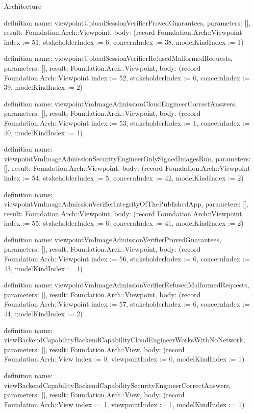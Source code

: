 \begin{lexlean}{Architecture}
\begin{semanticmodule}
definition{
  name: viewpointUploadSessionVerifierProvedGuarantees,
  parameters: [],
  result: Foundation.Arch::Viewpoint,
  body: (record Foundation.Arch::Viewpoint {index := 51, stakeholderIndex := 6, concernIndex := 38, modelKindIndex := 1})
}

definition{
  name: viewpointUploadSessionVerifierRefusedMalformedRequests,
  parameters: [],
  result: Foundation.Arch::Viewpoint,
  body: (record Foundation.Arch::Viewpoint {index := 52, stakeholderIndex := 6, concernIndex := 39, modelKindIndex := 2})
}

definition{
  name: viewpointVmImageAdmissionCloudEngineerCorrectAnswers,
  parameters: [],
  result: Foundation.Arch::Viewpoint,
  body: (record Foundation.Arch::Viewpoint {index := 53, stakeholderIndex := 1, concernIndex := 40, modelKindIndex := 1})
}

definition{
  name: viewpointVmImageAdmissionSecurityEngineerOnlySignedImagesRun,
  parameters: [],
  result: Foundation.Arch::Viewpoint,
  body: (record Foundation.Arch::Viewpoint {index := 54, stakeholderIndex := 5, concernIndex := 42, modelKindIndex := 2})
}

definition{
  name: viewpointVmImageAdmissionVerifierIntegrityOfThePublishedApp,
  parameters: [],
  result: Foundation.Arch::Viewpoint,
  body: (record Foundation.Arch::Viewpoint {index := 55, stakeholderIndex := 6, concernIndex := 41, modelKindIndex := 2})
}

definition{
  name: viewpointVmImageAdmissionVerifierProvedGuarantees,
  parameters: [],
  result: Foundation.Arch::Viewpoint,
  body: (record Foundation.Arch::Viewpoint {index := 56, stakeholderIndex := 6, concernIndex := 43, modelKindIndex := 1})
}

definition{
  name: viewpointVmImageAdmissionVerifierRefusedMalformedRequests,
  parameters: [],
  result: Foundation.Arch::Viewpoint,
  body: (record Foundation.Arch::Viewpoint {index := 57, stakeholderIndex := 6, concernIndex := 44, modelKindIndex := 2})
}

definition{
  name: viewBackendCapabilityBackendCapabilityCloudEngineerWorksWithNoNetwork,
  parameters: [],
  result: Foundation.Arch::View,
  body: (record Foundation.Arch::View {index := 0, viewpointIndex := 0, modelKindIndex := 1})
}

definition{
  name: viewBackendCapabilityBackendCapabilitySecurityEngineerCorrectAnswers,
  parameters: [],
  result: Foundation.Arch::View,
  body: (record Foundation.Arch::View {index := 1, viewpointIndex := 1, modelKindIndex := 1})
}


\end{semanticmodule}
\end{lexlean}

